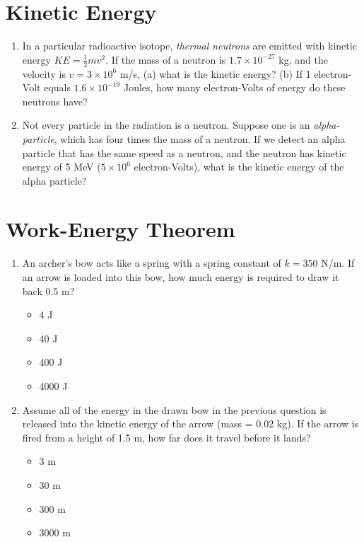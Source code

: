 \documentclass[10pt]{article}
\begin{document}
\section{Kinetic Energy}
\begin{enumerate}
\item In a particular radioactive isotope, \textit{thermal neutrons} are emitted with kinetic energy $KE = \frac{1}{2}mv^2$.  If the mass of a neutron is $1.7\times 10^{-27}$ kg, and the velocity is $v = 3\times 10^6$ m/s, (a) what is the kinetic energy? (b) If 1 electron-Volt equals $1.6 \times 10^{-19}$ Joules, how many electron-Volts of energy do these neutrons have? \\ \vspace{2cm}
\item Not every particle in the radiation is a neutron.  Suppose one is an \textit{alpha-particle}, which has four times the mass of a neutron.  If we detect an alpha particle that has the same speed as a neutron, and the neutron has kinetic energy of 5 MeV ($5 \times 10^{6}$ electron-Volts), what is the kinetic energy of the alpha particle? \\ \vspace{1.75cm}
\end{enumerate}
\section{Work-Energy Theorem}
\begin{enumerate}
\item An archer's bow acts like a spring with a spring constant of $k=350$ N/m.  If an arrow is loaded into this bow, how much energy is required to draw it back 0.5 m?
\begin{itemize}
\item 4 J
\item 40 J
\item 400 J
\item 4000 J
\end{itemize}
\item Assume all of the energy in the drawn bow in the previous question is released into the kinetic energy of the arrow (mass = 0.02 kg).  If the arrow is fired from a height of 1.5 m, how far does it travel before it lands?
\begin{itemize}
\item 3 m
\item 30 m
\item 300 m
\item 3000 m
\end{itemize}
\end{enumerate}
\end{document}
